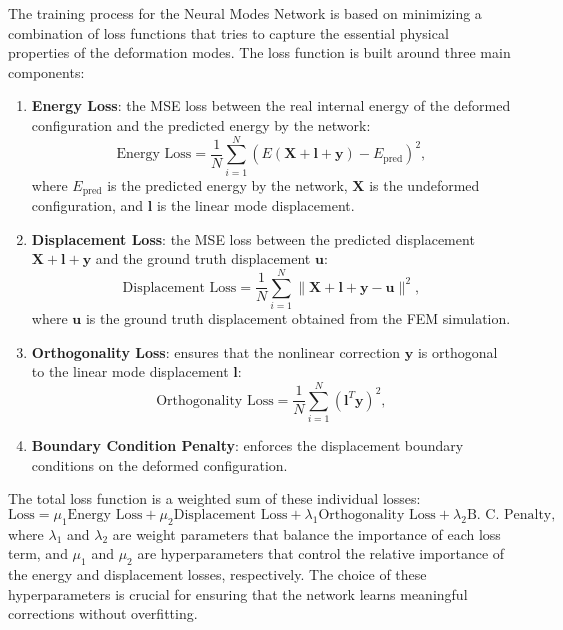 The training process for the Neural Modes Network is based on minimizing a combination of loss functions that tries to capture the essential physical properties of the deformation modes. The loss function is built around three main components:
\begin{enumerate}
    \item \textbf{Energy Loss}: the MSE loss between the real internal energy of the deformed configuration and the predicted energy by the network:
    \begin{equation}
        \text{Energy Loss} = \frac{1}{N} \sum_{i=1}^N (E(\bm{X} + \bm{l} + \bm{y}) - E_{\text{pred}})^2,
    \end{equation}
    where \( E_{\text{pred}} \) is the predicted energy by the network, \( \bm{X} \) is the undeformed configuration, and \( \bm{l} \) is the linear mode displacement.
    
    \item \textbf{Displacement Loss}: the MSE loss between the predicted displacement \( \bm{X} + \bm{l} + \bm{y} \) and the ground truth displacement \( \bm{u} \):
    \begin{equation}
        \text{Displacement Loss} = \frac{1}{N} \sum_{i=1}^N \|\bm{X} + \bm{l} + \bm{y} - \bm{u}\|^2,
    \end{equation}
    where \( \bm{u} \) is the ground truth displacement obtained from the FEM simulation.
    \item \textbf{Orthogonality Loss}: ensures that the nonlinear correction \( \bm{y} \) is orthogonal to the linear mode displacement \( \bm{l} \):
    \begin{equation}
        \text{Orthogonality Loss} = \frac{1}{N} \sum_{i=1}^N (\bm{l}^T \bm{y})^2,
    \end{equation}

    \item \textbf{Boundary Condition Penalty}: enforces the displacement boundary conditions on the deformed configuration.
    
\end{enumerate}

The total loss function is a weighted sum of these individual losses:
\begin{equation}
    \text{Loss} = \mu_1 \text{Energy Loss} + \mu_2 \text{Displacement Loss}+ \lambda_1 \text{Orthogonality Loss} + \lambda_2 \text{B. C. Penalty},
\end{equation}
where $\lambda_1$ and $\lambda_2$ are weight parameters that balance the importance of each loss term, and $\mu_1$ and $\mu_2$ are hyperparameters that control the relative importance of the energy and displacement losses, respectively. The choice of these hyperparameters is crucial for ensuring that the network learns meaningful corrections without overfitting.

